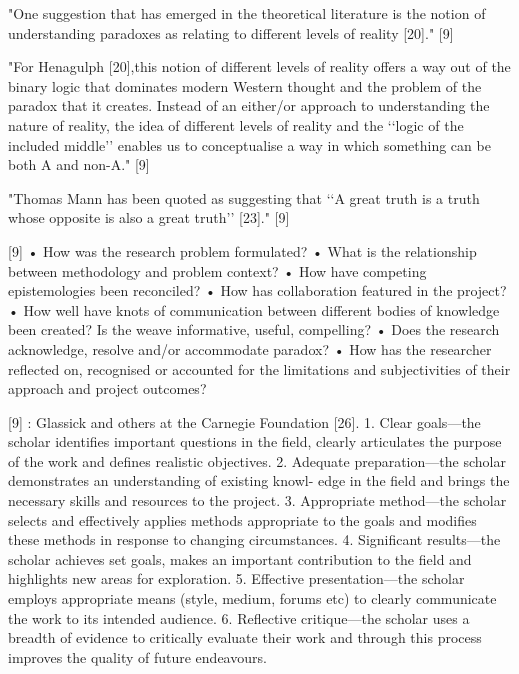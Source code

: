 "One suggestion that has emerged in the theoretical literature is the notion of understanding paradoxes as relating to different levels of reality [20]." [9]

"For Henagulph [20],this notion of different levels of reality offers a way out of the binary logic that dominates modern Western thought and the problem of the paradox that it creates. Instead of an either/or approach to understanding the nature of reality, the idea of different levels of reality and the ‘‘logic of the included middle’’ enables us to conceptualise a way in which something can be both A and non-A." [9]

"Thomas Mann has been quoted as suggesting that ‘‘A great truth is a truth whose opposite is also a great truth’’ [23]." [9]

[9]
•	How was the research problem formulated?
•	What is the relationship between methodology and problem context?
•	How have competing epistemologies been reconciled?
•	How has collaboration featured in the project?
•	How well have knots of communication between different bodies of knowledge been created? Is the weave informative, useful, compelling?
•	Does the research acknowledge, resolve and/or accommodate paradox?
•	How has the researcher reflected on, recognised or accounted for the limitations and subjectivities of their approach and project outcomes?


[9] : Glassick and others at the Carnegie Foundation [26].
1. Clear goals—the scholar identifies important questions in the field, clearly articulates the purpose of the work and defines realistic objectives.
2. Adequate preparation—the scholar demonstrates an understanding of existing knowl- edge in the field and brings the necessary skills and resources to the project.
3. Appropriate method—the scholar selects and effectively applies methods appropriate to the goals and modifies these methods in response to changing circumstances.
4. Significant results—the scholar achieves set goals, makes an important contribution to the field and highlights new areas for exploration.
5. Effective presentation—the scholar employs appropriate means (style, medium, forums etc) to clearly communicate the work to its intended audience.
6. Reflective critique—the scholar uses a breadth of evidence to critically evaluate their work and through this process improves the quality of future endeavours.

